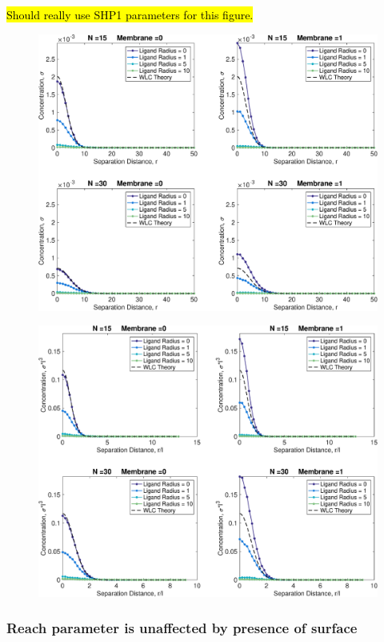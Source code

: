 \documentclass[../../AdvancementSummary.tex]{subfiles}
\begin{document}
\hl{Should really use SHP1 parameters for this figure.}
\begin{figure}[H]
    \begin{center}
        		\includegraphics[width=0.8\linewidth]{ResultsFigures/EffectiveConcentrationKernel/ConcentrationVSSeparation.eps}
        \caption{}
    \end{center}
\end{figure}

\begin{figure}[H]
    \begin{center}
        		\includegraphics[width=0.8\linewidth]{ResultsFigures/EffectiveConcentrationKernel/ConcentrationNondimVSSeparation.eps}
        \caption{}
    \end{center}
\end{figure}




\subsubsection{Reach parameter is unaffected by presence of surface}
\end{document}
